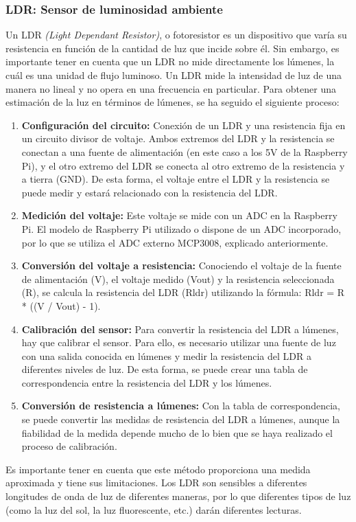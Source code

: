         \subsubsection{LDR: Sensor de luminosidad ambiente}
        Un LDR \textit{(Light Dependant Resistor)}, o fotoresistor es un dispositivo que varía su resistencia en función de la cantidad de luz que incide sobre él. Sin embargo, es importante tener en cuenta que un LDR no mide directamente los lúmenes, la cuál es una unidad de flujo luminoso. Un LDR mide la intensidad de luz de una manera no lineal y no opera en una frecuencia en particular. 
        Para obtener una estimación de la luz en términos de lúmenes, se ha seguido el siguiente proceso:    
        \begin{enumerate}    
            \item \textbf{Configuración del circuito:} 
            Conexión de un LDR y una resistencia fija en un circuito divisor de voltaje. Ambos extremos del LDR y la resistencia se conectan a una fuente de alimentación (en este caso a los 5V de la Raspberry Pi), y el otro extremo del LDR se conecta al otro extremo de la resistencia y a tierra (GND). De esta forma, el voltaje entre el LDR y la resistencia se puede medir y estará relacionado con la resistencia del LDR.   
            \item \textbf{Medición del voltaje:} 
            Este voltaje se mide con un ADC en la Raspberry Pi. El modelo de Raspberry Pi utilizado o dispone de un ADC incorporado, por lo que se utiliza el ADC externo MCP3008, explicado anteriormente.        
            \item \textbf{Conversión del voltaje a resistencia:} 
            Conociendo el voltaje de la fuente de alimentación (V), el voltaje medido (Vout) y la resistencia seleccionada (R), se calcula la resistencia del LDR (Rldr) utilizando la fórmula: Rldr = R * ((V / Vout) - 1).        
            \item \textbf{Calibración del sensor:} 
            Para convertir la resistencia del LDR a lúmenes, hay que calibrar el sensor. Para ello, es necesario utilizar una fuente de luz con una salida conocida en lúmenes y medir la resistencia del LDR a diferentes niveles de luz. De esta forma, se puede crear una tabla de correspondencia entre la resistencia del LDR y los lúmenes.   
            \item \textbf{Conversión de resistencia a lúmenes:} 
            Con la tabla de correspondencia, se puede convertir las medidas de resistencia del LDR a lúmenes, aunque la fiabilidad de la medida depende mucho de lo bien que se haya realizado el proceso de calibración.
        \end{enumerate}        
        Es importante tener en cuenta que este método proporciona una medida aproximada y tiene sus limitaciones. Los LDR son sensibles a diferentes longitudes de onda de luz de diferentes maneras, por lo que diferentes tipos de luz (como la luz del sol, la luz fluorescente, etc.) darán diferentes lecturas.   
        
